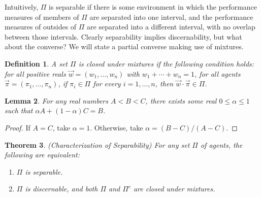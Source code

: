 \documentclass[twoside]{article}
\newtheorem{theorem}{Theorem}
\newtheorem{definition}[theorem]{Definition}
\newtheorem{lemma}[theorem]{Lemma}
\begin{document}
Intuitively, $\Pi$ is separable if there is some environment in which
the performance measures of members of $\Pi$ are separated into one
interval, and the performance measures of outsides of $\Pi$ are separated
into a different interval, with no overlap between those intervals.
Clearly separability implies discernability, but what about the converse?
We will state a partial converse making use of mixtures.

\begin{definition}
\label{mixtureclosuredef}
    A set $\Pi$ is \emph{closed under mixtures} if the following
    condition holds: for all positive reals $\vec w=(w_1,\ldots,w_n)$
    with $w_1+\cdots+w_n=1$,
    for all agents $\vec\pi=(\pi_1,\ldots,\pi_n)$,
    if $\pi_i\in \Pi$ for every $i=1,\ldots,n$, then
    $\vec w\cdot\vec\pi\in\Pi$.
\end{definition}

\begin{lemma}
\label{ivtlemma}
    For any real numbers $A<B<C$, there exists some real $0\leq \alpha\leq 1$
    such that $\alpha A + (1-\alpha)C=B$.
\end{lemma}

\begin{proof}
    If $A=C$, take $\alpha=1$. Otherwise, take $\alpha=(B-C)/(A-C)$.
\end{proof}

\begin{theorem}
    (Characterization of Separability)
    For any set $\Pi$ of agents, the following are equivalent:
    \begin{enumerate}
        \item $\Pi$ is separable.
        \item $\Pi$ is discernable, and both $\Pi$ and $\Pi^c$ are closed under mixtures.
    \end{enumerate}
\end{theorem}
\end{document}
